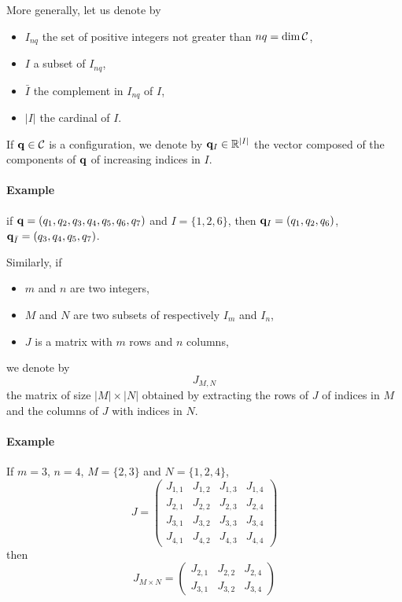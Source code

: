 More generally, let us denote by
\begin {itemize}
\item $I_{nq}$ the set of positive integers not greater than $nq=\dim\mathcal{C}$,
\item $I$ a subset of $I_{nq}$,
\item $\bar{I}$ the complement in $I_{nq}$ of $I$,
\item $|I|$ the cardinal of $I$.
\end {itemize}
If $\mathbf{q}\in\mathcal{C}$ is a configuration, we denote by $\mathbf{q}_{I}\in\mathbb{R}^{|I|}$ the vector composed of the components of $\mathbf{q}$ of increasing indices in $I$.
\paragraph {Example} if $\mathbf{q} = (q_1,q_2,q_3,q_4,q_5,q_6,q_7)$ and $I=\{1,2,6\}$, then $\mathbf{q}_I=(q_1,q_2,q_6)$, $\mathbf{q}_{\bar{I}}=(q_3,q_4,q_5,q_7)$.

Similarly, if
\begin{itemize}
\item $m$ and $n$ are two integers,
\item $M$ and $N$ are two subsets of respectively $I_{m}$ and $I_{n}$,
\item $J$ is a matrix with $m$ rows and $n$ columns,
\end{itemize}
we denote by
\begin{equation}\label{eq:sub-matrix}
  J_{M,N}
\end{equation}
the matrix of size $|M| \times |N|$ obtained by extracting the rows of $J$ of indices in $M$ and the columns of $J$ with indices in $N$.

\paragraph{Example}
If $m=3$, $n=4$, $M=\{2,3\}$ and $N=\{1,2,4\}$,
$$
J = \left(\begin{array}{cccc}
  J_{1,1} &   J_{1,2} &   J_{1,3} &   J_{1,4}\\
  J_{2,1} &   J_{2,2} &   J_{2,3} &   J_{2,4}\\
  J_{3,1} &   J_{3,2} &   J_{3,3} &   J_{3,4}\\
  J_{4,1} &   J_{4,2} &   J_{4,3} &   J_{4,4}
\end{array}\right)
$$
then
$$
J_{M\times N} = \left(\begin{array}{ccc}
  J_{2,1} &   J_{2,2} &   J_{2,4}\\
  J_{3,1} &   J_{3,2} &   J_{3,4}
\end{array}\right)
$$
  
